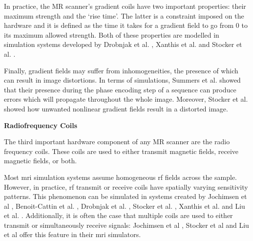 \hfill

In practice, the MR scanner's gradient coils have two important properties: their maximum strength and the `rise time'.
The latter is a constraint imposed on the hardware and it is defined as the time it takes for a gradient field to go from 0 to its maximum allowed strength.
Both of these properties are modelled in simulation systems developed by Drobnjak et al. \cite{Drobnjak2006}, Xanthis et al. \cite{Xanthis2014} and Stocker et al. \cite{Stocker2010}.

\hfill

Finally, gradient fields may suffer from inhomogeneities, the presence of which can result in image distortions.
In terms of simulations, Summers et al. \cite{Summers1986} showed that their presence during the phase encoding step of a sequence can produce errors which will propagate throughout the whole image.
Moreover, Stocker et al. \cite{Stocker2010} showed how unwanted nonlinear gradient fields result in a distorted image.

\hfill

\large \textbf{Radiofrequency Coils} \normalsize

The third important hardware component of any MR scanner are the radio frequency coils.
These coils are used to either transmit magnetic fields, receive magnetic fields, or both.

\hfill

Most \ac{mri} simulation systems assume homogeneous \ac{rf} fields across the sample.
However, in practice, \ac{rf} transmit or receive coils have spatially varying sensitivity patterns.
This phenomenon can be simulated in systems created by 
Jochimsen et al \cite{Jochimsen2004},
Benoit-Cattin et al. \cite{Benoit-Cattin2005},
Drobnjak et al. \cite{Drobnjak2006},
Stocker et al. \cite{Stocker2010}, 
Xanthis et al. \cite{Xanthis2014} and
Liu et al. \cite{Liu2017}.
Additionally, it is often the case that multiple coils are used to either transmit or simultaneously receive signals:
Jochimsen et al \cite{Jochimsen2004}, Stocker et al \cite{Stocker2010} and 
Liu et al \cite{Liu2014} offer this feature in their \ac{mri} simulators.

